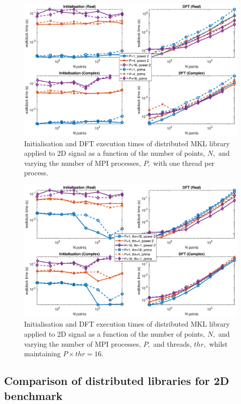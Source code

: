 \documentclass[a4paper]{article}
\begin{document}
\begin{figure}[htb]
    \centering
    \includegraphics[width=0.9\linewidth]{../results/mkl_2d_mpi.eps}
  \caption{Initialisation and DFT execution times of distributed MKL library applied to 2D signal as a function of the
    number of points, $N,$ and varying the number of MPI processes, $P,$ with one thread per process.}
  \label{2DDistMKL}
\end{figure}

\begin{figure}[htb]
    \centering
    \includegraphics[width=0.9\linewidth]{../results/mkl_2d_mpi_thr.eps}
  \caption{Initialisation and DFT execution times of distributed MKL library applied to 2D signal as a function of the
    number of points, $N,$ and varying the number of MPI processes, $P,$ and threads, $thr,$ whilst maintaining $P\times thr=16.$}
  \label{2DDistMKL16}
\end{figure}

\subsection{Comparison of distributed libraries for 2D benchmark}\label{Sec:2DDistComp}
\end{document}
